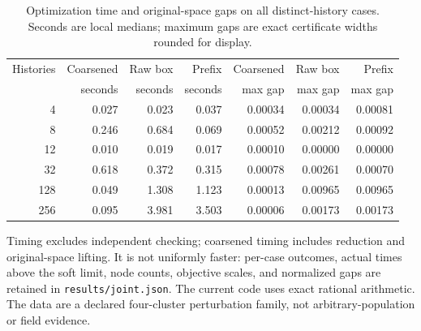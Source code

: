 \begin{table}[p]\centering
\caption{Optimization time and original-space gaps on all distinct-history cases. Seconds are local medians; maximum gaps are exact certificate widths rounded for display.}\label{tab:r47-times}
\begin{tabular}{rrrrrrr}\toprule
Histories & Coarsened & Raw box & Prefix & Coarsened & Raw box & Prefix \\
 & seconds & seconds & seconds & max gap & max gap & max gap \\\midrule
4 & 0.027 & 0.023 & 0.037 & 0.00034 & 0.00034 & 0.00081 \\
8 & 0.246 & 0.684 & 0.069 & 0.00052 & 0.00212 & 0.00092 \\
12 & 0.010 & 0.019 & 0.017 & 0.00010 & 0.00000 & 0.00000 \\
32 & 0.618 & 0.372 & 0.315 & 0.00078 & 0.00261 & 0.00070 \\
128 & 0.049 & 1.308 & 1.123 & 0.00013 & 0.00965 & 0.00965 \\
256 & 0.095 & 3.981 & 3.503 & 0.00006 & 0.00173 & 0.00173 \\
\bottomrule\end{tabular}
\par\smallskip\raggedright Timing excludes independent checking; coarsened timing includes reduction and original-space lifting. It is not uniformly faster: per-case outcomes, actual times above the soft limit, node counts, objective scales, and normalized gaps are retained in \texttt{results/joint.json}. The current code uses exact rational arithmetic. The data are a declared four-cluster perturbation family, not arbitrary-population or field evidence.
\end{table}
